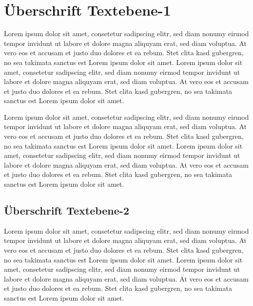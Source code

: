 %



\chapter{Überschrift Textebene-1}

Lorem ipsum dolor sit amet, consetetur sadipscing elitr, sed diam nonumy eirmod tempor invidunt ut labore et dolore magna aliquyam erat, sed diam voluptua. At vero eos et accusam et justo duo dolores et ea rebum. Stet clita kasd gubergren, no sea takimata sanctus est Lorem ipsum dolor sit amet. Lorem ipsum dolor sit amet, consetetur sadipscing elitr, sed diam nonumy eirmod tempor invidunt ut labore et dolore magna aliquyam erat, sed diam voluptua. At vero eos et accusam et justo duo dolores et ea rebum. Stet clita kasd gubergren, no sea takimata sanctus est Lorem ipsum dolor sit amet.
\bigskip

Lorem ipsum dolor sit amet, consetetur sadipscing elitr, sed diam nonumy eirmod tempor invidunt ut labore et dolore magna aliquyam erat, sed diam voluptua. At vero eos et accusam et justo duo dolores et ea rebum. Stet clita kasd gubergren, no sea takimata sanctus est Lorem ipsum dolor sit amet. Lorem ipsum dolor sit amet, consetetur sadipscing elitr, sed diam nonumy eirmod tempor invidunt ut labore et dolore magna aliquyam erat, sed diam voluptua. At vero eos et accusam et justo duo dolores et ea rebum. Stet clita kasd gubergren, no sea takimata sanctus est Lorem ipsum dolor sit amet.

\section{Überschrift Textebene-2}

Lorem ipsum dolor sit amet, consetetur sadipscing elitr, sed diam nonumy eirmod tempor invidunt ut labore et dolore magna aliquyam erat, sed diam voluptua. At vero eos et accusam et justo duo dolores et ea rebum. Stet clita kasd gubergren, no sea takimata sanctus est Lorem ipsum dolor sit amet. Lorem ipsum dolor sit amet, consetetur sadipscing elitr, sed diam nonumy eirmod tempor invidunt ut labore et dolore magna aliquyam erat, sed diam voluptua. At vero eos et accusam et justo duo dolores et ea rebum. Stet clita kasd gubergren, no sea takimata sanctus est Lorem ipsum dolor sit amet.

